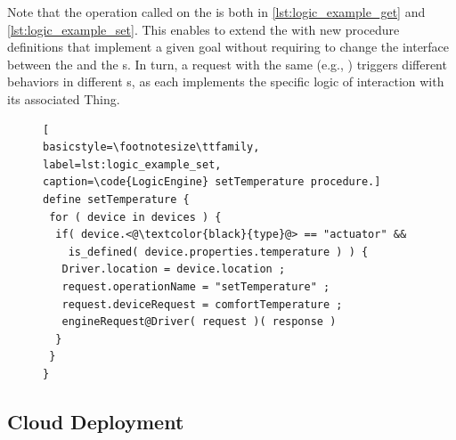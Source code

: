Note that the operation called on the  is 
both in \cref{lst:logic_example_get} and \cref{lst:logic_example_set}. This
enables to extend the  with new procedure definitions that
implement a given goal without requiring to change the interface between the
 and the s. In turn, a request with the same
 (e.g., ) triggers different
behaviors in different s, as each implements the specific logic
of interaction with its associated Thing.
%
\begin{figure}[t]
\begin{lstlisting}[
basicstyle=\footnotesize\ttfamily,
label=lst:logic_example_set,
caption=\code{LogicEngine} setTemperature procedure.]
define setTemperature {
 for ( device in devices ) {
  if( device.<@\textcolor{black}{type}@> == "actuator" && 
    is_defined( device.properties.temperature ) ) {
   Driver.location = device.location ;
   request.operationName = "setTemperature" ;
   request.deviceRequest = comfortTemperature ;
   engineRequest@Driver( request )( response )
  }
 } 
}
\end{lstlisting}
\end{figure}


\subsection{Cloud Deployment}

